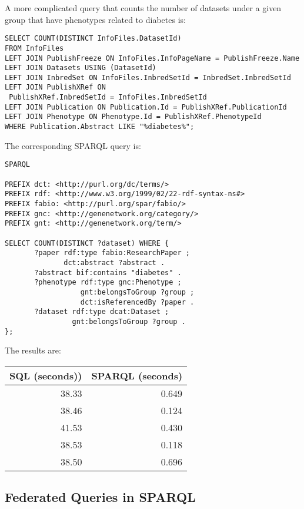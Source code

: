 A more complicated query that counts the number of datasets under a given group that have phenotypes related to diabetes is:

\begin{Verbatim}[frame=single]
SELECT COUNT(DISTINCT InfoFiles.DatasetId)
FROM InfoFiles
LEFT JOIN PublishFreeze ON InfoFiles.InfoPageName = PublishFreeze.Name
LEFT JOIN Datasets USING (DatasetId)
LEFT JOIN InbredSet ON InfoFiles.InbredSetId = InbredSet.InbredSetId
LEFT JOIN PublishXRef ON
 PublishXRef.InbredSetId = InfoFiles.InbredSetId
LEFT JOIN Publication ON Publication.Id = PublishXRef.PublicationId
LEFT JOIN Phenotype ON Phenotype.Id = PublishXRef.PhenotypeId
WHERE Publication.Abstract LIKE "%diabetes%";
\end{Verbatim}

The corresponding SPARQL query is:

\begin{Verbatim}[frame=single]
SPARQL

PREFIX dct: <http://purl.org/dc/terms/>
PREFIX rdf: <http://www.w3.org/1999/02/22-rdf-syntax-ns#>
PREFIX fabio: <http://purl.org/spar/fabio/>
PREFIX gnc: <http://genenetwork.org/category/>
PREFIX gnt: <http://genenetwork.org/term/>

SELECT COUNT(DISTINCT ?dataset) WHERE {
       ?paper rdf:type fabio:ResearchPaper ;
              dct:abstract ?abstract .
       ?abstract bif:contains "diabetes" .
       ?phenotype rdf:type gnc:Phenotype ;
                  gnt:belongsToGroup ?group ;
                  dct:isReferencedBy ?paper .
       ?dataset rdf:type dcat:Dataset ;
                gnt:belongsToGroup ?group .
};
\end{Verbatim}

The results are:

\begin{center}
\begin{tabular}{rr}
SQL (seconds)) & SPARQL (seconds)\\[0pt]
\hline
38.33 & 0.649\\[0pt]
38.46 & 0.124\\[0pt]
41.53 & 0.430\\[0pt]
38.53 & 0.118\\[0pt]
38.50 & 0.696\\[0pt]
\end{tabular}
\end{center}

\subsection{Federated Queries in SPARQL}

